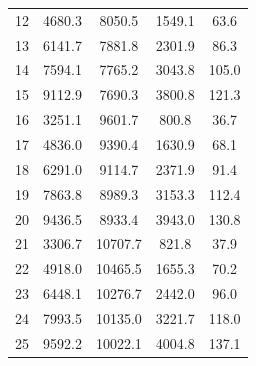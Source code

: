 \begin{longtable}{|c|c|c|c|c|}
    12           & 4680.3          & 8050.5                          & 1549.1 & 63.6       \\
    13           & 6141.7          & 7881.8                          & 2301.9 & 86.3       \\
    14           & 7594.1          & 7765.2                          & 3043.8 & 105.0      \\
    15           & 9112.9          & 7690.3                          & 3800.8 & 121.3      \\ \hline
    16           & 3251.1          & 9601.7                          & 800.8  & 36.7       \\
    17           & 4836.0          & 9390.4                          & 1630.9 & 68.1       \\
    18           & 6291.0          & 9114.7                          & 2371.9 & 91.4       \\
    19           & 7863.8          & 8989.3                          & 3153.3 & 112.4      \\
    20           & 9436.5          & 8933.4                          & 3943.0 & 130.8      \\ \hline
    21           & 3306.7          & 10707.7                         & 821.8  & 37.9       \\
    22           & 4918.0          & 10465.5                         & 1655.3 & 70.2       \\
    23           & 6448.1          & 10276.7                         & 2442.0 & 96.0       \\
    24           & 7993.5          & 10135.0                         & 3221.7 & 118.0      \\
    25           & 9592.2          & 10022.1                         & 4004.8 & 137.1      \\ \hline
\end{longtable}

